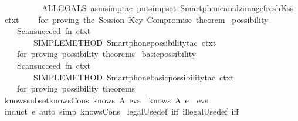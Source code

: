\begin{isabellebody}
  \ \ \ \ \ \ \ \ \ \ ALLGOALS\ {\isacharparenleft}asm{\isacharunderscore}simp{\isacharunderscore}tac\ {\isacharparenleft}put{\isacharunderscore}simpset\ Smartphone{\isachardot}analz{\isacharunderscore}image{\isacharunderscore}freshK{\isacharunderscore}ss\ ctxt{\isacharparenright}{\isacharparenright}{\isacharbrackright}{\isacharparenright}{\isacharparenright}{\isacharparenright}{\isacartoucheclose}\isanewline
  \ \ \ \ {\isachardoublequoteopen}for\ proving\ the\ Session\ Key\ Compromise\ theorem{\isachardoublequoteclose}\isanewline
  \isanewline
  \isamarkupfalse%
  \ possibility\ {\isacharequal}\ {\isacartoucheopen}\isanewline
  \ \ \ \ Scan{\isachardot}succeed\ {\isacharparenleft}fn\ ctxt\ {\isacharequal}{\isachargreater}\isanewline
  \ \ \ \ \ \ \ \ SIMPLE{\isacharunderscore}METHOD\ {\isacharparenleft}Smartphone{\isachardot}possibility{\isacharunderscore}tac\ ctxt{\isacharparenright}{\isacharparenright}{\isacartoucheclose}\isanewline
  \ \ \ \ {\isachardoublequoteopen}for\ proving\ possibility\ theorems{\isachardoublequoteclose}\isanewline
  \isanewline
  \isamarkupfalse%
  \ basic{\isacharunderscore}possibility\ {\isacharequal}\ {\isacartoucheopen}\isanewline
  \ \ \ \ Scan{\isachardot}succeed\ {\isacharparenleft}fn\ ctxt\ {\isacharequal}{\isachargreater}\isanewline
  \ \ \ \ \ \ \ \ SIMPLE{\isacharunderscore}METHOD\ {\isacharparenleft}Smartphone{\isachardot}basic{\isacharunderscore}possibility{\isacharunderscore}tac\ ctxt{\isacharparenright}{\isacharparenright}{\isacartoucheclose}\isanewline
  \ \ \ \ {\isachardoublequoteopen}for\ proving\ possibility\ theorems{\isachardoublequoteclose}%
  \endisatagML
  {\isafoldML}%
  \isadelimML
  \isanewline
  \endisadelimML
  \isanewline
  \isamarkupfalse%
  \ knows{\isacharunderscore}subset{\isacharunderscore}knows{\isacharunderscore}Cons{\isacharcolon}\ {\isachardoublequoteopen}knows\ A\ evs\ {\isasymsubseteq}\ knows\ A\ {\isacharparenleft}e\ {\isacharhash}\ evs{\isacharparenright}{\isachardoublequoteclose}\isanewline
  \isadelimproof
  \endisadelimproof
  \isatagproof
  \isamarkupfalse%
  \ {\isacharparenleft}induct\ e{\isacharparenright}\ {\isacharparenleft}auto\ simp{\isacharcolon}\ knows{\isacharunderscore}Cons{\isacharparenright}%
  \endisatagproof
  {\isafoldproof}%
  \isadelimproof
  \isanewline
  \endisadelimproof
  \isanewline
  \isanewline
  \isamarkupfalse%
  \ legalUse{\isacharunderscore}def\ {\isacharbrackleft}iff{\isacharbrackright}\ illegalUse{\isacharunderscore}def\ {\isacharbrackleft}iff{\isacharbrackright}\isanewline
  \isadelimtheory
  \isanewline
  \endisadelimtheory
  \isatagtheory
  \isamarkupfalse%
  \endisatagtheory
  {\isafoldtheory}%
  \isadelimtheory
  \endisadelimtheory
  \end{isabellebody}%
